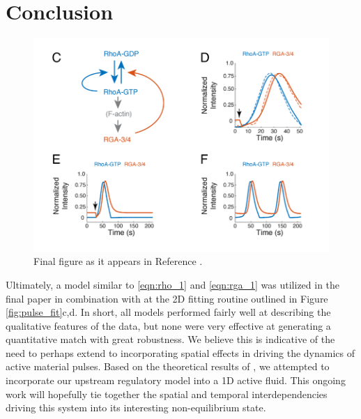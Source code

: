 \section{Conclusion}
\begin{figure}[h!]
\centering
\includegraphics[width=\hsize]{pulse/final_fig.png}
\caption{\label{fig:pulse_final}  Final figure as it appears in Reference \cite{Robin076356}.}
\end{figure}
Ultimately, a model similar to \ref{eqn:rho_1} and \ref{eqn:rga_1} was utilized in the final paper in combination with at the 2D fitting routine outlined in Figure \ref{fig:pulse_fit}c,d.   In short, all models performed fairly well at describing the qualitative features of the data, but none were very effective at generating a quantitative match with great robustness.    We believe this is indicative of the need to perhaps extend to incorporating spatial effects in driving the dynamics of active material pulses.  Based on the theoretical results of \cite{PhysRevLett.106.028103}, we attempted to incorporate our upstream regulatory model into a 1D active fluid.  This ongoing work will hopefully tie together the spatial and temporal interdependencies driving this system into its interesting non-equilibrium state.

